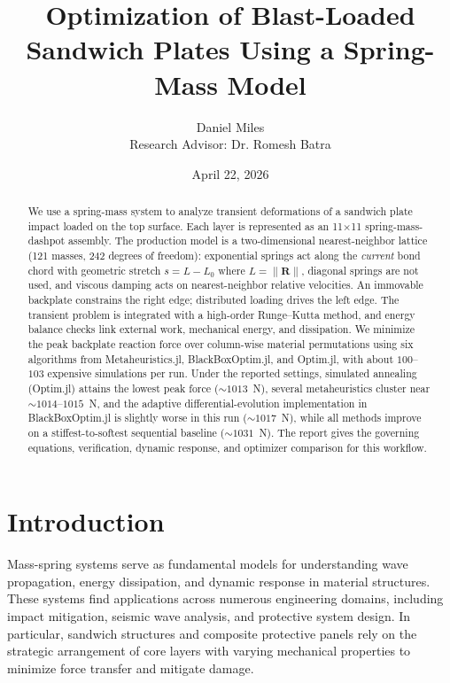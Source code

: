 \documentclass[11pt,a4paper]{article}
\title{Optimization of Blast-Loaded Sandwich Plates Using a Spring-Mass Model}
\author{Daniel Miles\\Research Advisor: Dr. Romesh Batra}
\date{April 22, 2026}
\begin{document}
\maketitle

\begin{abstract}
\noindent We use a spring-mass system to analyze transient deformations of a sandwich plate impact loaded on the top surface. Each layer is represented as an 11×11 spring-mass-dashpot assembly. The production model is a two-dimensional nearest-neighbor lattice (121 masses, 242 degrees of freedom): exponential springs act along the \emph{current} bond chord with geometric stretch $s = L - L_0$ where $L=\|\mathbf{R}\|$, diagonal springs are not used, and viscous damping acts on nearest-neighbor relative velocities. An immovable backplate constrains the right edge; distributed loading drives the left edge. The transient problem is integrated with a high-order Runge--Kutta method, and energy balance checks link external work, mechanical energy, and dissipation. We minimize the peak backplate reaction force over column-wise material permutations using six algorithms from Metaheuristics.jl, BlackBoxOptim.jl, and Optim.jl, with about $100$--$103$ expensive simulations per run. Under the reported settings, simulated annealing (Optim.jl) attains the lowest peak force ($\sim 1013$~N), several metaheuristics cluster near $\sim 1014$--$1015$~N, and the adaptive differential-evolution implementation in BlackBoxOptim.jl is slightly worse in this run ($\sim 1017$~N), while all methods improve on a stiffest-to-softest sequential baseline ($\sim 1031$~N). The report gives the governing equations, verification, dynamic response, and optimizer comparison for this workflow.
\end{abstract}

\section{Introduction}

\noindent Mass-spring systems serve as fundamental models for understanding wave propagation, energy dissipation, and dynamic response in material structures. These systems find applications across numerous engineering domains, including impact mitigation, seismic wave analysis, and protective system design. In particular, sandwich structures and composite protective panels rely on the strategic arrangement of core layers with varying mechanical properties to minimize force transfer and mitigate damage. \newline
\end{document}

